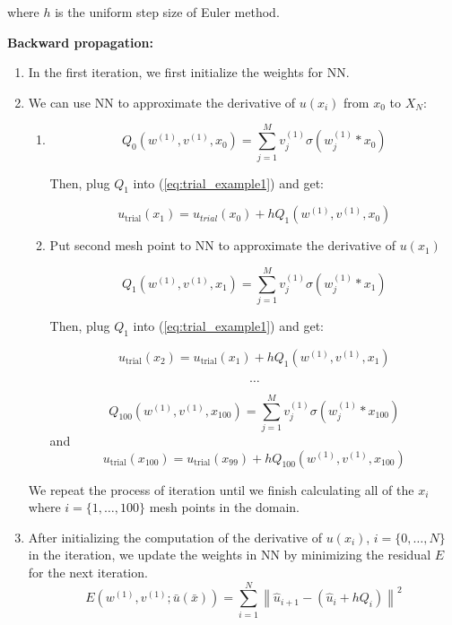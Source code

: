\documentclass{article}
\begin{document}
	\medspace \noindent
	where $h$ is the uniform step size of Euler method.  
	
	\medspace \noindent
	\textbf{Backward propagation:}\\


	\begin{enumerate}
	
	
		\item In the first iteration, we first initialize the weights for NN. 
		
		\item  We can use NN to approximate the derivative of $u(x_i)$  from $x_0$ to $X_N$:
		
		\begin{enumerate}
		
			\item 
	\[Q_0(w^{(1)},v^{(1)},x_0)=  \sum_{j=1}^{M}  v_{j}^{(1)}\sigma (w_{j}^{(1)}*x_0)\]
	
	
	Then, plug $Q_1$ into (\ref{eq:trial_example1}) and get:
	
	\[u_{\mathrm{trial}}(x_{1})=  u_{trial}(x_{0}) + hQ_1(w^{(1)},v^{(1)},x_0)\]
	
		\item 
	Put second mesh point to NN to approximate the derivative of $u(x_1)$ 
	
	\[Q_1(w^{(1)},v^{(1)},x_1)=  \sum_{j=1}^{M}  v_{j}^{(1)}\sigma (w_{j}^{(1)}*x_1)\]
	
		
	Then, plug $Q_1$ into (\ref{eq:trial_example1}) and get:
	
	\[u_{\mathrm{trial}}(x_{2})=  u_{\text{trial}}(x_{1}) + hQ_1(w^{(1)},v^{(1)},x_1)\]
	
  
	
  \[\dots\]
  
	 \[Q_{100}(w^{(1)},v^{(1)},x_{100})=  \sum_{j=1}^{M}  v_{j}^{(1)}\sigma (w_{j}^{(1)}*x_{100})\]
	 and
	\[u_{\text{trial}}(x_{100})=  u_{\text{trial}}(x_{99}) + hQ_{100}(w^{(1)},v^{(1)},x_{100})\]
	        \end{enumerate}
	We repeat the process of iteration until we finish calculating all of the $x_i$ where $i=\{1, \dots, 100\}$ mesh points in the domain.    
	

	\item After initializing the computation of the derivative of $u(x_i)$, $i=\{0, \dots, N\}$ in the iteration, we update the weights in NN by minimizing the residual $E$ for the next iteration. 
		\[E(w^{(1)},v^{(1)};\bar{u}(\bar{x})) = \sum_{i=1}^{N}\left \| \hat{u}_{i+1} - (\hat{u}_{i}+hQ_{i}) \right\|^{2}\]
		

\end{enumerate}
\end{document}
